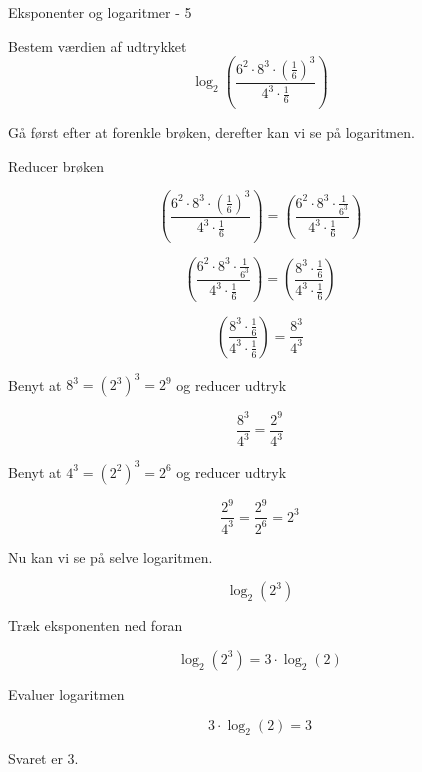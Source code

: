 \documentclass{article}
\begin{document}
\newpage
\begin{exercise}{Eksponenter og logaritmer - 5}
	
	Bestem værdien af udtrykket
	\[
	\log_2\left(\frac{6^2 \cdot 8^3 \cdot  \left( \frac{1}{6}\right)^3}{4^3 \cdot \frac{1}{6}} \right)
	\]
	
	
	\hint
	Gå først efter at forenkle brøken, derefter kan vi se på logaritmen.
	
	\hint
	Reducer brøken 
	
	\hint
	\[
	\left(\frac{6^2 \cdot 8^3 \cdot \left( \frac{1}{6}\right)^3}{4^3 \cdot \frac{1}{6}} \right) = 
	\left(\frac{6^2 \cdot 8^3 \cdot \frac{1}{6^3}}{4^3 \cdot \frac{1}{6}} \right)
	\]
	
	\hint
	\[
	\left(\frac{6^2 \cdot 8^3 \cdot \frac{1}{6^3}}{4^3 \cdot \frac{1}{6}} \right) = 
	\left(\frac{8^3 \cdot \frac{1}{6}}{4^3 \cdot \frac{1}{6}} \right)
	\]
	
	\hint
	\[
	\left(\frac{8^3 \cdot \frac{1}{6}}{4^3 \cdot \frac{1}{6}} \right) = \frac{8^3}{4^3}
	\]
	
	\hint
	Benyt at $8^3=(2^3)^3 = 2^9$ og reducer udtryk
	
	\hint
	\[
	\frac{8^3}{4^3} = \frac{2^9}{4^3}
	\]
	
	\hint
	Benyt at $4^3=(2^2)^3 = 2^6$ og reducer udtryk
	
	\hint
	\[
	\frac{2^9}{4^3} = \frac{2^9}{2^6} = 2^3
	\]
	
	
	\hint
	Nu kan vi se på selve logaritmen.
	
	\hint
	\[
	\log_2\left(2^3\right)
	\]
	
	
	\hint
	Træk eksponenten ned foran
	
	\hint
	\[
	\log_2\left(2^{3}\right) = 3 \cdot \log_2(2)
	\]
	
	\hint
	Evaluer logaritmen
	
	\hint
	\[
	3 \cdot \log_2(2) = 3
	\]
	
	\hint
	Svaret er $3$.
	
\end{exercise}
\end{document}
